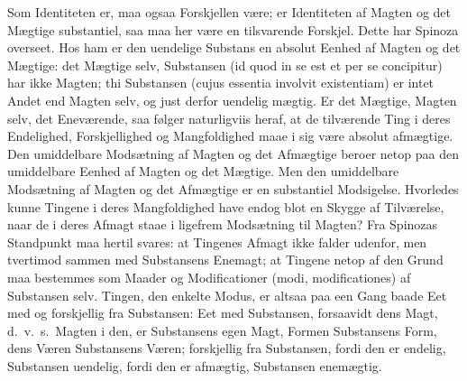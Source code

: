 \documentclass[12pt]{book}
\newcommand{\opage}[1]{\marginnote{\footnotesize\textit{[#1]}}}
\begin{document}
Som Identiteten er, maa ogsaa Forskjellen være; er Identiteten af Magten og det
Mægtige substantiel, saa maa her være en tilsvarende Forskjel. Dette har Spinoza
overseet. Hos ham er den uendelige Substans en absolut Eenhed af Magten og det
Mægtige: det Mægtige selv, Substansen (id quod in se est et per se concipitur) har
ikke Magten; thi Substansen (cujus essentia involvit existentiam) er intet Andet end
Magten selv, og just derfor uendelig mægtig. Er det Mægtige, Magten selv, det
Eneværende, saa følger naturligviis heraf, at de tilværende Ting i deres Endelighed,
Forskjellighed og Mangfoldighed maae i sig være absolut afmægtige. Den umiddelbare
Modsætning af Magten og det Afmægtige beroer netop paa den umiddelbare Eenhed af
Magten og det Mægtige. Men den umiddelbare Modsætning af Magten og det Afmægtige er en
substantiel Modsigelse. Hvorledes kunne Tingene i deres Mangfoldighed have endog blot
en Skygge af Tilværelse, naar de i deres Afmagt staae i ligefrem Modsætning til
Magten? Fra Spinozas Standpunkt maa hertil svares: at Tingenes Afmagt ikke falder
udenfor, men tvertimod sammen med Substansens Enemagt; at Tingene netop af den Grund
maa bestemmes som Maader og Modificationer (modi, modificationes) af Substansen selv.
\opage{112} Tingen, den enkelte Modus, er altsaa paa een Gang baade Eet med og forskjellig fra
Substansen: Eet med Substansen, forsaavidt dens Magt, d.\ v.\ s.\ Magten i den, er
Substansens egen Magt, Formen Substansens Form, dens Væren Substansens Væren;
forskjellig fra Substansen, fordi den er endelig, Substansen uendelig, fordi den er
afmægtig, Substansen enemægtig.
\end{document}
